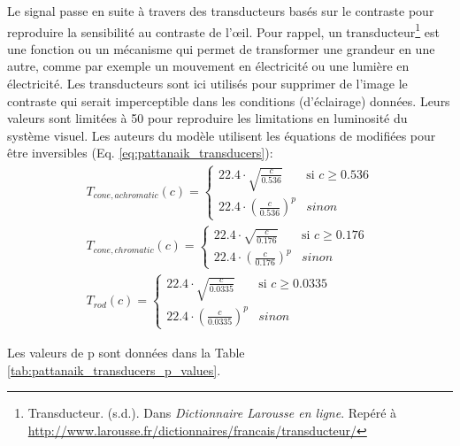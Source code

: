 	\par Le signal passe en suite à travers des transducteurs basés sur le contraste pour reproduire la sensibilité au contraste de l'œil. Pour rappel, un transducteur\footnote{Transducteur. (s.d.). Dans \textit{Dictionnaire Larousse en ligne}. Repéré à \url{http://www.larousse.fr/dictionnaires/francais/transducteur/}} est une fonction ou un mécanisme qui permet de transformer une grandeur en une autre, comme par exemple un mouvement en électricité ou une lumière en électricité. Les transducteurs sont ici utilisés pour supprimer de l'image le contraste qui serait imperceptible dans les conditions (d'éclairage) données. Leurs valeurs sont limitées à 50 pour reproduire les limitations en luminosité du système visuel. Les auteurs du modèle utilisent les équations de \citep{watson_model_1997} modifiées pour être inversibles (Eq. \ref{eq:pattanaik_transducers}):
	\begin{equation}
	\begin{array}{c}
	
	T_{cone,achromatic}(c) = \begin{cases}
	22.4 \cdot \sqrt{\frac{c}{0.536}} & \mbox{si } c \geq 0.536\\
	22.4 \cdot \left( \frac{c}{0.536} \right)^p & sinon
	\end{cases}\\
	
	T_{cone,chromatic}(c) = \begin{cases}
	22.4 \cdot \sqrt{\frac{c}{0.176}} & \mbox{si } c \geq 0.176\\
	22.4 \cdot \left( \frac{c}{0.176} \right)^p & sinon
	\end{cases}\\
	
	T_{rod}(c) = \begin{cases}
	22.4 \cdot \sqrt{\frac{c}{0.0335}} & \mbox{si } c \geq 0.0335\\
	22.4 \cdot \left( \frac{c}{0.0335} \right)^p & sinon
	\end{cases}
	
	\end{array}
	\label{eq:pattanaik_transducers}
	\end{equation}
	
	\par Les valeurs de p sont données dans la Table \ref{tab:pattanaik_transducers_p_values}.
	
